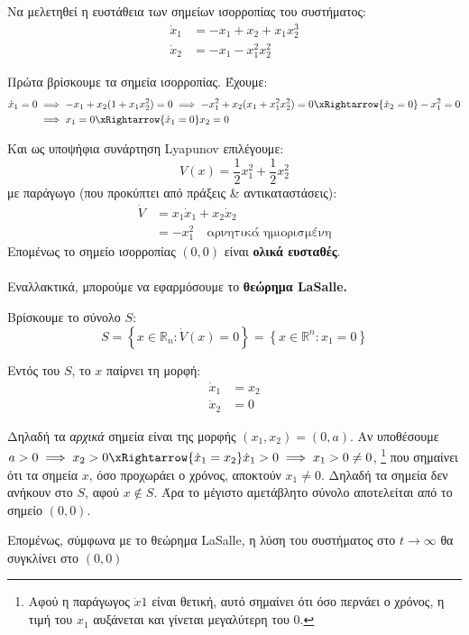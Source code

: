 \documentclass[11pt,a4paper,notitlepage,fleqn]{article}
\begin{document}
\begin{exercise}[Εφαρμογή]
	Να μελετηθεί η ευστάθεια των σημείων ισορροπίας του συστήματος:
	\begin{align*}
		\dot x_1 &= -x_1+x_2 + x_1x_2^3 \\
		\dot x_2 &= -x_1 -x_1^2x_2^2
	\end{align*}

	\tcblower
	Πρώτα βρίσκουμε τα σημεία ισορροπίας. Έχουμε:
	\begin{align*}
		\dot x_1 = 0 &\implies
		-x_1 + x_2(1+x_1x_2^2) = 0
		\implies -x_1^2 + x_2(x_1+x_1^2x_2^2) = 0
		\xRightarrow{\dot x_2 = 0} -x_1^2 = 0
		\\
		&\implies x_1 = 0
		\xRightarrow{\dot x_1 = 0} x_2 = 0
	\end{align*}

	Και ως υποψήφια συνάρτηση Lyapunov επιλέγουμε:
	\[
	V(x) = \frac{1}{2}x_1^2 + \frac{1}{2}x_2^2
	\]
	με παράγωγο (που προκύπτει από πράξεις \& αντικαταστάσεις):
	\begin{align*}
		\dot V &= x_1\dot x_1 + x_2\dot x_2 \\ &= -x_1^2 \quad \text{αρνητικά ημιορισμένη}
	\end{align*}
	Επομένως το σημείο ισορροπίας \( (0,0) \) είναι \textbf{ολικά ευσταθές}.

	\paragraph{}
	Εναλλακτικά, μπορούμε να εφαρμόσουμε το \textbf{θεώρημα
		LaSalle.}

	Βρίσκουμε το σύνολο \( S \):
	\[
	S = \left\lbrace  x\in\mathbb R_n : \dot V(x) = 0 \right\rbrace
	= \left\lbrace x \in \mathbb R^n : x_1 = 0 \right\rbrace
	\]

	Εντός του \( S \), το \( x \) παίρνει τη μορφή:
	\begin{align*}
		\dot x_1 &= x_2 \\ \dot x_2 &= 0
	\end{align*}

	Δηλαδή τα \textit{αρχικά} σημεία είναι της μορφής \( (x_1,x_2) = (0,a) \). Αν
	υποθέσουμε \( a > 0 \implies x_2 > 0 \xRightarrow{\dot x_1 = x_2} \dot x_1 > 0 \implies
	x_1 > 0 \neq 0 \), \footnote{Αφού η παράγωγος $\dot x1$ είναι θετική, αυτό σημαίνει ότι όσο περνάει ο χρόνος, η τιμή του  $x_1$  αυξάνεται και γίνεται μεγαλύτερη του 0.} που σημαίνει ότι
	τα σημεία \( x \), όσο προχωράει ο χρόνος, αποκτούν
	\( x_1 \neq 0 \). Δηλαδή τα σημεία δεν ανήκουν στο \( S \), αφού
	\( x \notin S \). Άρα το μέγιστο αμετάβλητο σύνολο αποτελείται από
	το σημείο
	\( (0,0) \).

	Επομένως, σύμφωνα με το θεώρημα LaSalle, η λύση του συστήματος στο \( t \to \infty \) θα συγκλίνει στο \( (0,0) \)
\end{exercise}
\end{document}
